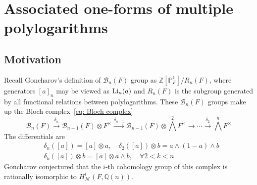 \section{Associated one-forms of multiple polylogarithms}\label{sec: one-forms of multiple polylogarithms}

\subsection{Motivation}

Recall Goncharov's definition of $\mathcal B_n(F)$ group as $\mathbb Z[\mathbb P^1_F]/R_n(F)$, where generators $[a]_n$ may be viewed as $\operatorname{Li}_n(a)$ and $R_n(F)$ is the subgroup generated by all functional relations between polylogarithms. These $\mathcal B_n(F)$ groups make up the Bloch complex~\eqref{eq: Bloch complex}
\[
\mathcal B_n(F)\xrightarrow{\delta_n}\mathcal B_{n-1}(F)\otimes F^\times\xrightarrow{\delta_{n-1}}\mathcal B_{n-1}(F)\otimes \textstyle\bigwedge^2F^\times\to\cdots\xrightarrow{\delta_2}\textstyle\bigwedge^nF^\times
\]
The differentials are
\begin{equation}\label{eq: differentials for Bloch complex}
\begin{aligned}
&\delta_n([a])=[a]\otimes a,\quad \delta_2([a])\otimes b= a\wedge (1-a)\wedge b\\
&\delta_k([a])\otimes b=[a]\otimes a\wedge b, \quad\forall 2<k<n
\end{aligned}
\end{equation}
Goncharov conjectured that the $i$-th cohomology group of this complex is rationally isomorphic to $H^i_{\mathcal M}(F,\mathbb Q(n))$.

